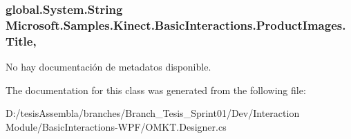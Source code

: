 \hypertarget{class_microsoft_1_1_samples_1_1_kinect_1_1_basic_interactions_1_1_product_images_aa49dd0c143020189b073750c3374a9dc}{
\subsubsection[{Title}]{\setlength{\rightskip}{0pt plus 5cm}global.\-System.\-String Microsoft.\-Samples.\-Kinect.\-Basic\-Interactions.\-Product\-Images.\-Title\hspace{0.3cm}{\ttfamily [get]}, {\ttfamily [set]}}}\label{class_microsoft_1_1_samples_1_1_kinect_1_1_basic_interactions_1_1_product_images_aa49dd0c143020189b073750c3374a9dc}


No hay documentación de metadatos disponible. 



The documentation for this class was generated from the following file\-:\begin{DoxyCompactItemize}
\item 
D\-:/tesis\-Assembla/branches/\-Branch\-\_\-\-Tesis\-\_\-\-Sprint01/\-Dev/\-Interaction Module/\-Basic\-Interactions-\/\-W\-P\-F/O\-M\-K\-T.\-Designer.\-cs\end{DoxyCompactItemize}
